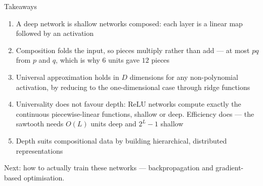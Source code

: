 \documentclass[aspectratio=169, 11pt]{beamer}
\newcommand{\nosrc}{}       %
\begin{document}
\begin{frame}{Takeaways}
  \nosrc
  \vspace{0.1em}
  {\footnotesize
  \begin{enumerate}\setlength{\itemsep}{2pt}
    \item A \alert{deep network} is shallow networks
          \alert{composed}: each layer is a linear map followed by
          an activation
    \item Composition \alert{folds} the input, so pieces
          \alert{multiply} rather than add --- at most $pq$ from
          $p$ and $q$, which is why $6$ units gave $12$ pieces
    \item \alert{Universal approximation} holds in $D$ dimensions
          for any non-polynomial activation, by reducing to the
          one-dimensional case through \alert{ridge functions}
    \item Universality does not favour depth: ReLU networks compute
          exactly the continuous piecewise-linear functions,
          shallow or deep. \alert{Efficiency} does --- the sawtooth
          needs $O(L)$ units deep and $2^{L}-1$ shallow
    \item Depth suits \alert{compositional} data by building
          hierarchical, distributed representations
  \end{enumerate}}
  \vspace{-0.1em}
  \begin{redhighlight}
    {\scriptsize Next: how to actually \alert{train} these networks
    --- backpropagation and gradient-based optimisation.}
  \end{redhighlight}
\end{frame}
\end{document}
